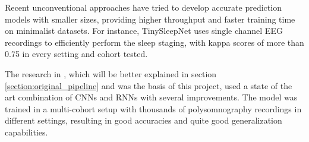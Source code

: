 Recent unconventional approaches have tried to develop accurate prediction models with smaller sizes, providing higher throughput and faster training time on minimalist datasets. For instance, TinySleepNet \cite{2020tinysleepnet} uses single channel EEG recordings to efficiently perform the sleep staging, with kappa scores of more than 0.75 in every setting and cohort tested. 

The research in \cite{Alexander2020}, which will be better explained in section \ref{section:original_pipeline} and was the basis of this project, used a state of the art combination of CNNs and RNNs with several improvements. The model was trained in a multi-cohort setup with thousands of polysomnography recordings in different settings, resulting in good accuracies and quite good generalization capabilities. 








